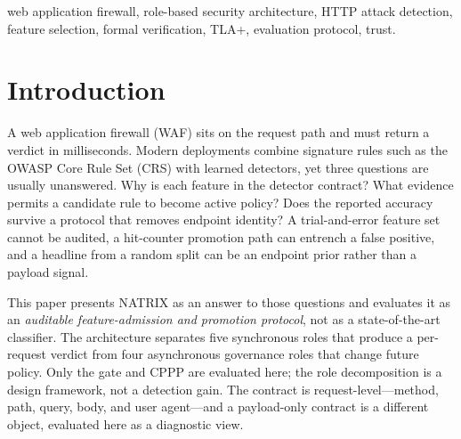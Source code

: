 \documentclass[conference]{IEEEtran}
\begin{document}
\begin{IEEEkeywords}
web application firewall, role-based security architecture, HTTP attack detection, feature selection, formal verification, TLA+, evaluation protocol, trust.
\end{IEEEkeywords}

\section{Introduction}
A web application firewall (WAF) sits on the request path and must return a verdict in milliseconds. Modern deployments combine signature rules such as the OWASP Core Rule Set (CRS) with learned detectors, yet three questions are usually unanswered. Why is each feature in the detector contract? What evidence permits a candidate rule to become active policy? Does the reported accuracy survive a protocol that removes endpoint identity? A trial-and-error feature set cannot be audited, a hit-counter promotion path can entrench a false positive, and a headline from a random split can be an endpoint prior rather than a payload signal.

This paper presents NATRIX as an answer to those questions and evaluates it as an \emph{auditable feature-admission and promotion protocol}, not as a state-of-the-art classifier. The architecture separates five synchronous roles that produce a per-request verdict from four asynchronous governance roles that change future policy. Only the gate and CPPP are evaluated here; the role decomposition is a design framework, not a detection gain. The contract is request-level---method, path, query, body, and user agent---and a payload-only contract is a different object, evaluated here as a diagnostic view.
\end{document}
